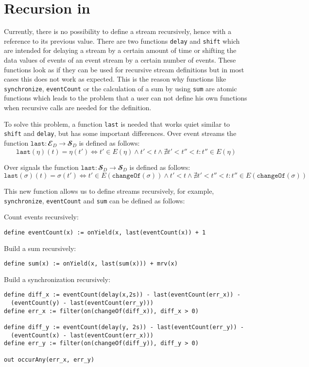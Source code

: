\section{Recursion in \tessla}

Currently, there is no possibility to define a stream recursively, hence with a reference to its previous value. There are two functions \texttt{delay} and \texttt{shift} which are intended for delaying a stream by a certain amount of time or shifting the data values of events of an event stream by a certain number of events. These functions look as if they can be used for recursive stream definitions but in most cases this does not work as expected. This is the reason why functions like \texttt{synchronize}, \texttt{eventCount} or the calculation of a sum by using \texttt{sum} are atomic functions which leads to the problem that a user can not define his own functions when recursive calls are needed for the definition.

To solve this problem, a function \texttt{last} is needed that works quiet similar to \texttt{shift} and \texttt{delay}, but has some important differences. Over event streams the function $\texttt{last}: 𝓔_D \rightarrow 𝓢_D$ is defined as follows:
\[\texttt{last}(\eta)(t) = \eta(t') \Leftrightarrow t' \in E(\eta) \land t' < t \land \nexists t' < t'' < t: t'' \in E(\eta)\] 

Over signals the function $\texttt{last}: 𝓢_D \rightarrow 𝓢_D$ is defined as follows:
\[\texttt{last}(\sigma)(t) = \sigma(t') \Leftrightarrow t' \in E(\texttt{changeOf}(\sigma)) \land t' < t \land \nexists t' < t'' < t: t'' \in E(\texttt{changeOf}(\sigma))\] 

This new function allows us to define streams recursively, for example, \texttt{synchronize}, \texttt{eventCount} and \texttt{sum} can be defined as follows:

Count events recursively:
\begin{lstlisting}[language=tessla+salt]
define eventCount(x) := onYield(x, last(eventCount(x)) + 1
\end{lstlisting}

Build a sum recursively:
\begin{lstlisting}[language=tessla+salt]
define sum(x) := onYield(x, last(sum(x))) + mrv(x)
\end{lstlisting}

Build a synchronization recursively:

\begin{lstlisting}[language=tessla+salt]
define diff_x := eventCount(delay(x,2s)) - last(eventCount(err_x)) - 
  (eventCount(y) - last(eventCount(err_y)))
define err_x := filter(on(changeOf(diff_x)), diff_x > 0)

define diff_y := eventCount(delay(y, 2s)) - last(eventCount(err_y)) - 
  (eventCount(x) - last(eventCount(err_x)))
define err_y := filter(on(changeOf(diff_y)), diff_y > 0)

out occurAny(err_x, err_y)
\end{lstlisting}
